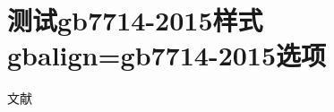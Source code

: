 \documentclass[twoside]{article}
\begin{document}
\section{测试gb7714-2015样式gbalign=gb7714-2015选项}
文献\cite{张伯伟2002--}\cite{CRAWFPRD1995--}\cite{陈志勇2011--}\cite{Babu2014--}\cite{汤万金2013-09-30--}
\cite{Calkin2011-8-9}\cite{吴云芳2003--}\cite{CALMS1965--}\cite{BUSECK1980-117-211}\cite{陈建军2010-93-93}
\cite{张凯军2012-04-05--}\cite{KOSEKI2002--}
\cite{全国广播电视标准化技术委员会2007-1-1}\cite{国家环境保护局科技标准司1996-2-3}
\cite{楼梦麟2011-11-12}
\cite{DESMARAIS1992-605-609}\cite{张田勤2000--}\cite{萧钰2001--}
\printbibliography[heading=subbibintoc,title=【参考文献】]
\end{document}
